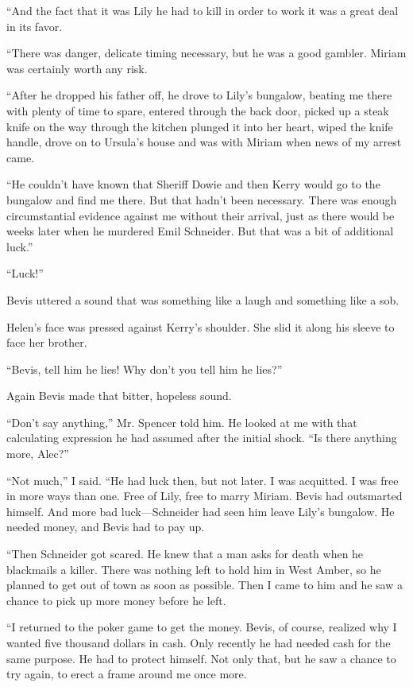 \documentclass{novel}
\begin{document}
“And the fact that it was Lily he had to kill in order to work it was a great deal in its favor.

“There was danger, delicate timing necessary, but he was a good gambler. Miriam was certainly worth any risk.

“After he dropped his father off, he drove to Lily’s bungalow, beating me there with plenty of time to spare, entered through the back door, picked up a steak knife on the way through the kitchen plunged it into her heart, wiped the knife handle, drove on to Ursula’s house and was with Miriam when news of my arrest came. 

“He couldn’t have known that Sheriff Dowie and then Kerry would go to the bungalow and find me there. But that hadn’t been necessary. There was enough circumstantial evidence against me without their arrival, just as there would be weeks later when he murdered Emil Schneider. But that was a bit of additional luck.”

“Luck!”

Bevis uttered a sound that was something like a laugh and something like a sob.

Helen’s face was pressed against Kerry’s shoulder. She slid it along his sleeve to face her brother. 

“Bevis, tell him he lies! Why don’t you tell him he lies?”

\scenestars

Again Bevis made that bitter, hopeless sound.

“Don’t say anything,” Mr. Spencer told him. He looked at me with that calculating expression he had assumed after the initial shock. “Is there anything more, Alec?”

“Not much,” I said. “He had luck then, but not later. I was acquitted. I was free in more ways than one. Free of Lily, free to marry Miriam. Bevis had outsmarted himself. And more bad luck—Schneider had seen him leave Lily’s bungalow. He needed money, and Bevis had to pay up. 

“Then Schneider got scared. He knew that a man asks for death when he blackmails a killer. There was nothing left to hold him in West Amber, so he planned to get out of town as soon as possible. Then I came to him and he saw a chance to pick up more money before he left.

“I returned to the poker game to get the money. Bevis, of course, realized why I wanted five thousand dollars in cash. Only recently he had needed cash for the same purpose. He had to protect himself. Not only that, but he saw a chance to try again, to erect a frame around me once more. 
\end{document}
